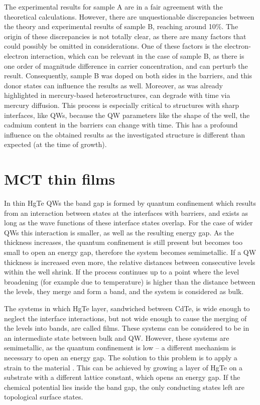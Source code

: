 \documentclass[titlepage,a4paper]{book}
\newcommand{\wciecie}{\quad\phantom{v}}
\begin{document}
The experimental results for sample A are in a fair agreement with the theoretical calculations. However, there are unquestionable discrepancies between the theory and experimental results of sample B, reaching around 10\%. The origin of these discrepancies is not totally clear, as there are many factors that could possibly be omitted in considerations. One of these factors is the electron-electron interaction, which can be relevant in the case of sample B, as there is one order of magnitude difference in carrier concentration, and can perturb the result. Consequently, sample B was doped on both sides in the barriers, and this donor states can influence the results as well. Moreover, as was already highlighted in \cite{Zholudev_MCT_QW} mercury-based heterostructures, can degrade with time via mercury diffusion. This process is especially critical to structures with sharp interfaces, like QWs, because the QW parameters like the shape of the well, the cadmium content in the barriers can change with time. This has a profound influence on the obtained results as the investigated structure is different than expected (at the time of growth).  

\clearpage
\section{MCT thin films}
\label{chpt:MCT_TL}
\wciecie
In thin HgTe QWs the band gap is formed by quantum confinement which results from an interaction between states at the interfaces with barriers, and exists as long as the wave functions of these interface states overlap. For the case of wider QWs this interaction is smaller, as well as the resulting energy gap. As the thickness increases, the quantum confinement is still present but becomes too small to open an energy gap, therefore the system becomes semimetallic. If a QW thickness is increased even more, the relative distances between consecutive levels within the well shrink. If the process continues up to a point where the level broadening (for example due to temperature) is higher than the distance between the levels, they merge and form a band, and the system is considered as bulk.

The systems in which HgTe layer, sandwiched between CdTe, is wide enough to neglect the interface interactions, but not wide enough to cause the merging of the levels into bands, are called films. These systems can be considered to be in an intermediate state between bulk and QW. However, these systems are semimetallic, as the quantum confinement is low -- a different mechanism is necessary to open an energy gap. The solution to this problem is to apply a strain to the material \cite{Dai_MCT_layers}. This can be achieved by growing a layer of HgTe on a substrate with a different lattice constant, which opens an energy gap. If the chemical potential lies inside the band gap, the only conducting states left are topological surface states. 
\end{document}
